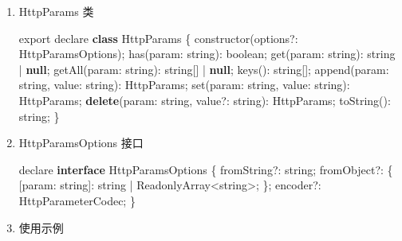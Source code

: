 \documentclass[
]{article}
\newenvironment{Shaded}{}{}
\newcommand{\DataTypeTok}[1]{\textcolor[rgb]{0.56,0.13,0.00}{#1}}
\newcommand{\FunctionTok}[1]{\textcolor[rgb]{0.02,0.16,0.49}{#1}}
\newcommand{\ImportTok}[1]{#1}
\newcommand{\KeywordTok}[1]{\textcolor[rgb]{0.00,0.44,0.13}{\textbf{#1}}}
\newcommand{\NormalTok}[1]{#1}
\newcommand{\OperatorTok}[1]{\textcolor[rgb]{0.40,0.40,0.40}{#1}}
\begin{document}
\begin{enumerate}
\def\labelenumi{\arabic{enumi}.}
\item
  HttpParams 类

\begin{Shaded}
\begin{Highlighting}[]
\ImportTok{export}\NormalTok{ declare }\KeywordTok{class}\NormalTok{ HttpParams \{}
    \FunctionTok{constructor}\NormalTok{(options}\OperatorTok{?:}\NormalTok{ HttpParamsOptions)}\OperatorTok{;}
    \FunctionTok{has}\NormalTok{(}\DataTypeTok{param}\OperatorTok{:}\NormalTok{ string)}\OperatorTok{:}\NormalTok{ boolean}\OperatorTok{;}
    \FunctionTok{get}\NormalTok{(}\DataTypeTok{param}\OperatorTok{:}\NormalTok{ string)}\OperatorTok{:}\NormalTok{ string }\OperatorTok{|} \KeywordTok{null}\OperatorTok{;}
    \FunctionTok{getAll}\NormalTok{(}\DataTypeTok{param}\OperatorTok{:}\NormalTok{ string)}\OperatorTok{:}\NormalTok{ string[] }\OperatorTok{|} \KeywordTok{null}\OperatorTok{;}
    \FunctionTok{keys}\NormalTok{()}\OperatorTok{:}\NormalTok{ string[]}\OperatorTok{;}
    \FunctionTok{append}\NormalTok{(}\DataTypeTok{param}\OperatorTok{:}\NormalTok{ string}\OperatorTok{,} \DataTypeTok{value}\OperatorTok{:}\NormalTok{ string)}\OperatorTok{:}\NormalTok{ HttpParams}\OperatorTok{;}
    \FunctionTok{set}\NormalTok{(}\DataTypeTok{param}\OperatorTok{:}\NormalTok{ string}\OperatorTok{,} \DataTypeTok{value}\OperatorTok{:}\NormalTok{ string)}\OperatorTok{:}\NormalTok{ HttpParams}\OperatorTok{;}
    \KeywordTok{delete}\NormalTok{(}\DataTypeTok{param}\OperatorTok{:}\NormalTok{ string}\OperatorTok{,}\NormalTok{ value}\OperatorTok{?:}\NormalTok{ string)}\OperatorTok{:}\NormalTok{ HttpParams}\OperatorTok{;}
    \FunctionTok{toString}\NormalTok{()}\OperatorTok{:}\NormalTok{ string}\OperatorTok{;}
\NormalTok{\}}
\end{Highlighting}
\end{Shaded}
\item
  HttpParamsOptions 接口

\begin{Shaded}
\begin{Highlighting}[]
\NormalTok{declare }\KeywordTok{interface}\NormalTok{ HttpParamsOptions \{}
\NormalTok{    fromString}\OperatorTok{?:}\NormalTok{ string}\OperatorTok{;}
\NormalTok{    fromObject}\OperatorTok{?:}\NormalTok{ \{}
\NormalTok{        [}\DataTypeTok{param}\OperatorTok{:}\NormalTok{ string]}\OperatorTok{:}\NormalTok{ string }\OperatorTok{|}\NormalTok{ ReadonlyArray}\OperatorTok{\textless{}}\NormalTok{string}\OperatorTok{\textgreater{};}
\NormalTok{    \}}\OperatorTok{;}
\NormalTok{    encoder}\OperatorTok{?:}\NormalTok{ HttpParameterCodec}\OperatorTok{;}
\NormalTok{\}}
\end{Highlighting}
\end{Shaded}
\item
  使用示例


\end{enumerate}
\end{document}
